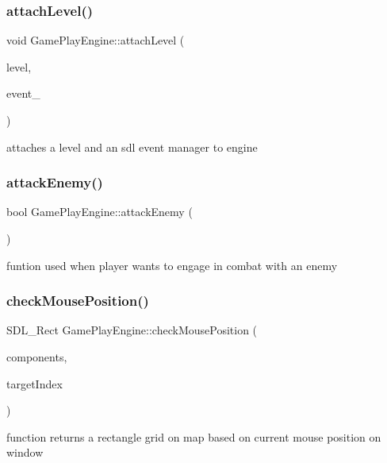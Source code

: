 \subsubsection{\texorpdfstring{attach\+Level()}{attachLevel()}}
{\footnotesize\ttfamily void Game\+Play\+Engine\+::attach\+Level (\begin{DoxyParamCaption}\item[{\hyperlink{class_pre_built_level}{Pre\+Built\+Level} $\ast$}]{level,  }\item[{S\+D\+L\+\_\+\+Event $\ast$}]{event\+\_\+ }\end{DoxyParamCaption})}

attaches a level and an sdl event manager to engine \hypertarget{class_game_play_engine_a72d2da26054fde8cf0f801e6df871b82}{}\label{class_game_play_engine_a72d2da26054fde8cf0f801e6df871b82} 
\subsubsection{\texorpdfstring{attack\+Enemy()}{attackEnemy()}}
{\footnotesize\ttfamily bool Game\+Play\+Engine\+::attack\+Enemy (\begin{DoxyParamCaption}{ }\end{DoxyParamCaption})}

funtion used when player wants to engage in combat with an enemy \hypertarget{class_game_play_engine_a2cbd6100775c2a55b46c4f3a29d166b1}{}\label{class_game_play_engine_a2cbd6100775c2a55b46c4f3a29d166b1} 
\subsubsection{\texorpdfstring{check\+Mouse\+Position()}{checkMousePosition()}}
{\footnotesize\ttfamily S\+D\+L\+\_\+\+Rect Game\+Play\+Engine\+::check\+Mouse\+Position (\begin{DoxyParamCaption}\item[{std\+::vector$<$ S\+D\+L\+\_\+\+Rect $>$}]{components,  }\item[{int $\ast$}]{target\+Index }\end{DoxyParamCaption})}

function returns a rectangle grid on map based on current mouse position on window \hypertarget{class_game_play_engine_a2b5f4dc886288daecaa2be9b9a8ca287}{}\label{class_game_play_engine_a2b5f4dc886288daecaa2be9b9a8ca287} 

